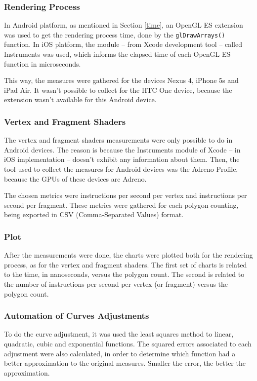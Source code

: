 \documentclass[10pt, conference, compsocconf]{IEEEtran}
\begin{document}
\subsubsection{Rendering Process}

In Android platform, as mentioned in Section \ref{time}, an OpenGL ES extension
was used to get the rendering process time, done by the \texttt{glDrawArrays()}
function. In iOS platform, the module -- from Xcode development tool -- called Instruments was used, 
which informs the elapsed time of each OpenGL ES function in microseconds.

 This way, the measures were gathered for the devices Nexus 4, iPhone 5s and
iPad Air. It wasn't possible to collect for the HTC One device, because the extension
wasn't available for this Android device.

\subsubsection{Vertex and Fragment Shaders}

The vertex and fragment shaders measurements were only possible to do in
Android devices. The reason is because the Instruments module of Xcode -- in iOS implementation -- doesn't exhibit
any information about them. Then, the tool used to collect the measures for Android devices was the
Adreno Profile, because the GPUs of these devices are Adreno. 

 The chosen metrics were instructions per second per vertex and instructions
per second per fragment. These metrics were gathered for each polygon counting,
being exported in CSV (Comma-Separated Values) format.

\subsubsection{Plot}

After the measurements were done, the charts were plotted both for the 
rendering process, as for the vertex and fragment shaders. The first set of charts is related to the time, 
in nanoseconds, versus the polygon count. The second is related to the number of instructions per second
per vertex (or fragment) versus the polygon count. 

\subsubsection{Automation of Curves Adjustments}

To do the curve adjustment, it was used the least squares method to linear,
quadratic, cubic and exponential functions. The squared errors associated to each
adjustment were also calculated, in order to determine which function had
a better approximation to the original measures. Smaller the error, the better the approximation.
\end{document}
